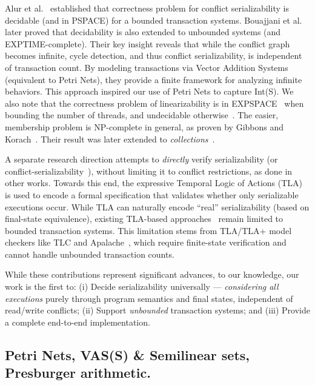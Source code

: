 %
Alur et al.~\cite{AlMcPe96} established that correctness problem for conflict serializability is decidable (and in PSPACE) for a bounded transaction systems. Bouajjani et al.~\cite{BoEmEnHa13} later proved that decidability is also extended to unbounded systems (and EXPTIME-complete). Their key insight reveals that while the conflict graph becomes infinite, cycle detection, and thus conflict serializability, is independent of transaction count. By modeling transactions via Vector Addition Systems (equivalent to Petri Nets), they provide a finite framework for analyzing infinite behaviors. This approach inspired our use of Petri Nets to capture Int(S).
%
We also note that the correctness problem of linearizability is in 
EXPSPACE~\cite{AlMcPe96} when bounding the number of threads, and undecidable 
otherwise~\cite{BoEmEnHa13}. The easier, membership problem is NP-complete in 
general, as proven by Gibbons and Korach~\cite{GiKo97}. Their result was later 
extended to \textit{collections}~\cite{EmEn18}.

A separate research direction attempts to \textit{directly} verify serializability (or conflict-serializability~\cite{CoOlPnTuZu07}), without limiting it to conflict restrictions, as done in other works. Towards this end, the expressive Temporal Logic of Actions (TLA)~\cite{La94} is used to encode a formal specification that validates whether only serializable executions occur. While TLA can naturally encode ``real'' serializability (based on final-state equivalence), existing TLA-based approaches~\cite{SoVaVi20, Ho24} remain limited to bounded transaction systems. This limitation stems from TLA/TLA+ model checkers like TLC and Apalache~\cite{YuMaLa99, KoKuTr19}, which require finite-state verification and cannot handle unbounded transaction counts.

%
While these contributions represent significant advances, to our knowledge, our work is the first to:
(i) Decide serializability universally --- \textit{considering all executions} purely through program semantics and final states, independent of read/write conflicts; 
(ii) Support \textit{unbounded} transaction systems; and
(iii) Provide a complete end-to-end implementation.

\subsection{Petri Nets, VAS(S) \& Semilinear sets, Presburger arithmetic.}
\label{sec:related:petri}

